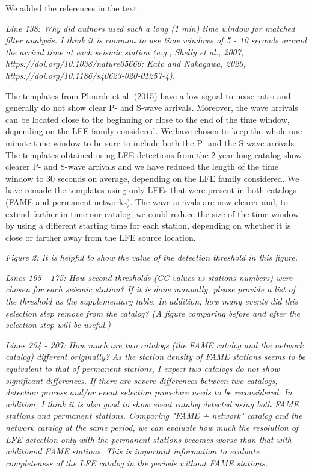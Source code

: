 \documentclass[letterpaper, 12pt]{article}
\begin{document}
\bigskip

We added the references in the text.

\bigskip

\textit{Line 138: Why did authors used such a long (1 min) time window for matched filter analysis. I think it is common to use time windows of 5 - 10 seconds around the arrival time at each seismic station (e.g., Shelly et al., 2007, https://doi.org/10.1038/nature05666; Kato and Nakagawa, 2020, https://doi.org/10.1186/s40623-020-01257-4).}

\bigskip

The templates from Plourde et al. (2015) have a low signal-to-noise ratio and generally do not show clear P- and S-wave arrivals. Moreover, the wave arrivals can be located close to the beginning or close to the end of the time window, depending on the LFE family considered. We have chosen to keep the whole one-minute time window to be sure to include both the P- and the S-wave arrivals. The templates obtained using LFE detections from the 2-year-long catalog show clearer P- and S-wave arrivals and we have reduced the length of the time window to 30 seconds on average, depending on the LFE family considered. We have remade the templates using only LFEs that were present in both catalogs (FAME and permanent networks). The wave arrivals are now clearer and, to extend farther in time our catalog, we could reduce the size of the time window by using a different starting time for each station, depending on whether it is close or farther away from the LFE source location. 

\bigskip

\textit{Figure 2: It is helpful to show the value of the detection threshold in this figure.}

\bigskip

\textit{Lines 165 - 175: How second thresholds (CC values vs stations numbers) were chosen for each seismic station? If it is done manually, please provide a list of the threshold as the supplementary table. In addition, how many events did this selection step remove from the catalog? (A figure comparing before and after the selection step will be useful.)}

\bigskip

\textit{Lines 204 - 207: How much are two catalogs (the FAME catalog and the network catalog) different originally? As the station density of FAME stations seems to be equivalent to that of permanent stations, I expect two catalogs do not show significant differences. If there are severe differences between two catalogs, detection process and/or event selection procedure needs to be reconsidered. In addition, I think it is also good to show event catalog detected using both FAME stations and permanent stations. Comparing "FAME + network" catalog and the network catalog at the same period, we can evaluate how much the resolution of LFE detection only with the permanent stations becomes worse than that with additional FAME stations. This is important information to evaluate completeness of the LFE catalog in the periods without FAME stations.}
\end{document}
